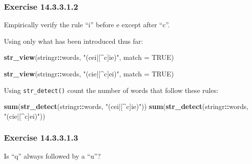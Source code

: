 \documentclass[]{book}
\newenvironment{Shaded}{\begin{snugshade}}{\end{snugshade}}
\newcommand{\DataTypeTok}[1]{\textcolor[rgb]{0.13,0.29,0.53}{#1}}
\newcommand{\KeywordTok}[1]{\textcolor[rgb]{0.13,0.29,0.53}{\textbf{#1}}}
\newcommand{\NormalTok}[1]{#1}
\newcommand{\OperatorTok}[1]{\textcolor[rgb]{0.81,0.36,0.00}{\textbf{#1}}}
\newcommand{\OtherTok}[1]{\textcolor[rgb]{0.56,0.35,0.01}{#1}}
\newcommand{\StringTok}[1]{\textcolor[rgb]{0.31,0.60,0.02}{#1}}
\theoremstyle{plain}
\theoremstyle{remark}
\begin{document}
\hypertarget{exercise-14.3.3.1.2}{%
\subsubsection*{\texorpdfstring{Exercise
{14.3.3.1.2}}{Exercise 14.3.3.1.2}}\label{exercise-14.3.3.1.2}}

Empirically verify the rule ``i'' before e except after ``c''.

Using only what has been introduced thus far:

\begin{Shaded}
\begin{Highlighting}[]
\KeywordTok{str_view}\NormalTok{(stringr}\OperatorTok{::}\NormalTok{words, }\StringTok{"(cei|[^c]ie)"}\NormalTok{, }\DataTypeTok{match =} \OtherTok{TRUE}\NormalTok{)}
\end{Highlighting}
\end{Shaded}

\begin{Shaded}
\begin{Highlighting}[]
\KeywordTok{str_view}\NormalTok{(stringr}\OperatorTok{::}\NormalTok{words, }\StringTok{"(cie|[^c]ei)"}\NormalTok{, }\DataTypeTok{match =} \OtherTok{TRUE}\NormalTok{)}
\end{Highlighting}
\end{Shaded}

Using \texttt{str\_detect()} count the number of words that follow these
rules:

\begin{Shaded}
\begin{Highlighting}[]
\KeywordTok{sum}\NormalTok{(}\KeywordTok{str_detect}\NormalTok{(stringr}\OperatorTok{::}\NormalTok{words, }\StringTok{"(cei|[^c]ie)"}\NormalTok{))}
\KeywordTok{sum}\NormalTok{(}\KeywordTok{str_detect}\NormalTok{(stringr}\OperatorTok{::}\NormalTok{words, }\StringTok{"(cie|[^c]ei)"}\NormalTok{))}
\end{Highlighting}
\end{Shaded}

\hypertarget{exercise-14.3.3.1.3}{%
\subsubsection*{\texorpdfstring{Exercise
{14.3.3.1.3}}{Exercise 14.3.3.1.3}}\label{exercise-14.3.3.1.3}}

Is ``q'' always followed by a ``u''?
\end{document}

